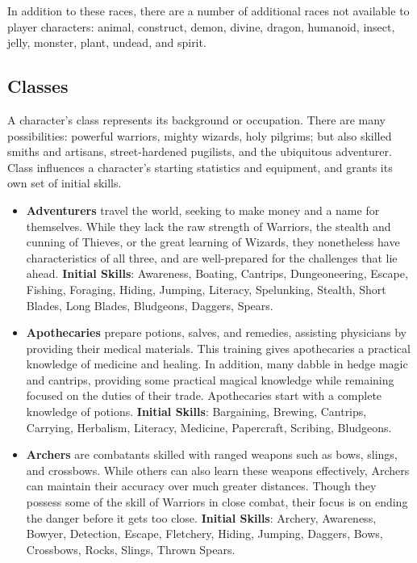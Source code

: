 In addition to these races, there are a number of additional races not
available to player characters: animal, construct, demon, divine, dragon,
humanoid, insect, jelly, monster, plant, undead, and spirit.

\subsection{Classes}

A character's class represents its background or occupation.  There are
many possibilities: powerful warriors, mighty wizards, holy pilgrims; but
also skilled smiths and artisans, street-hardened pugilists, and the
ubiquitous adventurer.  Class influences a character's starting statistics
and equipment, and grants its own set of initial skills.

\begin{itemize}
\item {\bf Adventurers} travel the world, seeking to make money and a name 
for themselves.  While they lack the raw strength of Warriors, the stealth 
and cunning of Thieves, or the great learning of Wizards, they nonetheless 
have characteristics of all three, and are well-prepared for the challenges
that lie ahead.  \textbf{Initial Skills}: Awareness, Boating, 
Cantrips, Dungeoneering, Escape, Fishing, Foraging, Hiding, Jumping, 
Literacy, Spelunking, Stealth, Short Blades, Long Blades, Bludgeons, 
Daggers, Spears.

\item {\bf Apothecaries} prepare potions, salves, and remedies, assisting 
physicians by providing their medical materials.  This training gives 
apothecaries a practical knowledge of medicine and healing.  In addition, 
many dabble in hedge magic and cantrips, providing some practical magical 
knowledge while remaining focused on the duties of their trade.
Apothecaries start with a complete knowledge of potions.
\textbf{Initial Skills}: Bargaining, Brewing, Cantrips, Carrying,
Herbalism, Literacy, Medicine, Papercraft, Scribing, Bludgeons.

\item {\bf Archers} are combatants skilled with ranged weapons such as 
bows, slings, and crossbows.  While others can also learn these weapons 
effectively, Archers can maintain their accuracy over much greater 
distances.  Though they possess some of the skill of Warriors in close 
combat, their focus is on ending the danger before it gets too close.  
\textbf{Initial Skills}: Archery, Awareness, Bowyer, Detection, Escape,
Fletchery, Hiding, Jumping, Daggers, Bows, Crossbows, Rocks, Slings,
Thrown Spears.


\end{itemize}
